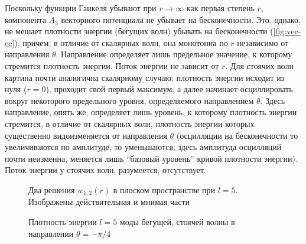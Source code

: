 \documentclass[\docroot/reports/draft/report.tex]{subfiles}
\begin{document}
        Поскольку функции Ганкеля убывают при $r \to \infty$ как первая степень $r$, компонента $A_3$ векторного потенциала не убывает на бесконечности. Это, однако, не мешает плотности энергии (бегущих волн) убывать на бесконечности (\autoref{fig:vec-ee}), причем, в отличие от скалярных волн, она монотонна по $r$ независимо от направления $\theta$. Направление определяет лишь предельное значение, к которому стремится плотность энергии. Поток энергии не зависит от $r$. Для стоячих волн картина почти аналогична скалярному случаю: плотность энергии исходит из нуля ($r = 0$), проходит свой первый максимум, а далее начинает осциллировать вокруг некоторого предельного уровня, определяемого направлением $\theta$. Здесь направление, опять же, определяет лишь уровень, к которому плотность энергии стремится, в отличие от скалярных волн, плотность энергии которых существенно видоизменяется от направления $\theta$ (осцилляции на бесконечности то увеличиваются по амплитуде, то уменьшаются; здесь амплитуда осцилляций почти неизменна, меняется лишь \enquote{базовый уровень} кривой плотности энергии). Поток энергии у стоячих волн, разумеется, отсутствует.
        \begin{figure}[h]
            \centering
            \hspace{8pt}%
            \hspace{8pt}%
            \caption[]{Два решения $w_{1,2}(r)$ в плоском пространстве при $l = 5$. Изображены действительная и мнимая части}%
            \label{fig:vec-h12}%
        \end{figure}
        \begin{figure}[h]
            \centering
            \hspace{8pt}%
            \hspace{8pt}%
            \caption[]{Плотность энергии $l = 5$ моды  бегущей,  стоячей волны в направлении $\theta = -\pi/4$}%
            \label{fig:vec-ee}%
        \end{figure}
\end{document}
